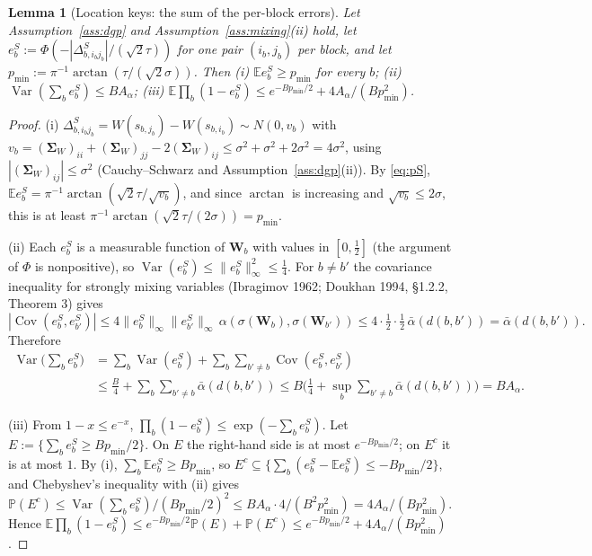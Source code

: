 \documentclass[11pt]{article}
\newtheorem{lemma}{Lemma}
\theoremstyle{definition}
\newcommand{\bW}{\mathbf{W}}
\newcommand{\bSig}{\boldsymbol{\Sigma}}
\newcommand{\E}{\mathbb{E}}
\newcommand{\Prob}{\mathbb{P}}
\newcommand{\Var}{\operatorname{Var}}
\newcommand{\Cov}{\operatorname{Cov}}
\begin{document}
\begin{lemma}[Location keys: the sum of the per-block errors]\label{lem:lln}
Let Assumption~\ref{ass:dgp} and Assumption~\ref{ass:mixing}(ii) hold, let $e^S_b:=\Phi(-|\Delta^S_{b,i_bj_b}|/(\sqrt2\tau))$ for one pair $(i_b,j_b)$ per block, and let $p_{\min}:=\pi^{-1}\arctan(\tau/(\sqrt2\sigma))$. Then (i) $\E e^S_b\ge p_{\min}$ for every $b$; (ii) $\Var(\sum_be^S_b)\le BA_\alpha$; (iii) $\E\prod_b(1-e^S_b)\le e^{-Bp_{\min}/2}+4A_\alpha/(Bp_{\min}^2)$.
\end{lemma}
\begin{proof}
(i) $\Delta^S_{b,i_bj_b}=W(s_{b,j_b})-W(s_{b,i_b})\sim N(0,v_b)$ with $v_b=(\bSig_W)_{ii}+(\bSig_W)_{jj}-2(\bSig_W)_{ij}\le\sigma^2+\sigma^2+2\sigma^2=4\sigma^2$, using $|(\bSig_W)_{ij}|\le\sigma^2$ (Cauchy--Schwarz and Assumption~\ref{ass:dgp}(ii)). By \eqref{eq:pS}, $\E e^S_b=\pi^{-1}\arctan(\sqrt2\tau/\sqrt{v_b})$, and since $\arctan$ is increasing and $\sqrt{v_b}\le2\sigma$, this is at least $\pi^{-1}\arctan(\sqrt2\tau/(2\sigma))=p_{\min}$.

(ii) Each $e^S_b$ is a measurable function of $\bW_b$ with values in $[0,\tfrac12]$ (the argument of $\Phi$ is nonpositive), so $\Var(e^S_b)\le\|e^S_b\|_\infty^2\le\tfrac14$. For $b\ne b'$ the covariance inequality for strongly mixing variables (Ibragimov 1962; Doukhan 1994, \S1.2.2, Theorem 3) gives
\[
|\Cov(e^S_b,e^S_{b'})|\le4\|e^S_b\|_\infty\|e^S_{b'}\|_\infty\,\alpha(\sigma(\bW_b),\sigma(\bW_{b'}))\le4\cdot\tfrac12\cdot\tfrac12\,\bar\alpha(d(b,b'))=\bar\alpha(d(b,b')).
\]
Therefore
\[
\begin{aligned}
\Var\Big(\sum_be^S_b\Big)&=\sum_b\Var(e^S_b)+\sum_b\sum_{b'\ne b}\Cov(e^S_b,e^S_{b'})\\
&\le\frac B4+\sum_b\sum_{b'\ne b}\bar\alpha(d(b,b'))\le B\Big(\frac14+\sup_b\sum_{b'\ne b}\bar\alpha(d(b,b'))\Big)=BA_\alpha .
\end{aligned}
\]

(iii) From $1-x\le e^{-x}$, $\prod_b(1-e^S_b)\le\exp(-\sum_be^S_b)$. Let $E:=\{\sum_be^S_b\ge Bp_{\min}/2\}$. On $E$ the right-hand side is at most $e^{-Bp_{\min}/2}$; on $E^c$ it is at most $1$. By (i), $\sum_b\E e^S_b\ge Bp_{\min}$, so $E^c\subseteq\{\sum_b(e^S_b-\E e^S_b)\le-Bp_{\min}/2\}$, and Chebyshev's inequality with (ii) gives $\Prob(E^c)\le\Var(\sum_be^S_b)/(Bp_{\min}/2)^2\le BA_\alpha\cdot4/(B^2p_{\min}^2)=4A_\alpha/(Bp_{\min}^2)$. Hence $\E\prod_b(1-e^S_b)\le e^{-Bp_{\min}/2}\Prob(E)+\Prob(E^c)\le e^{-Bp_{\min}/2}+4A_\alpha/(Bp_{\min}^2)$.
\end{proof}
\end{document}
